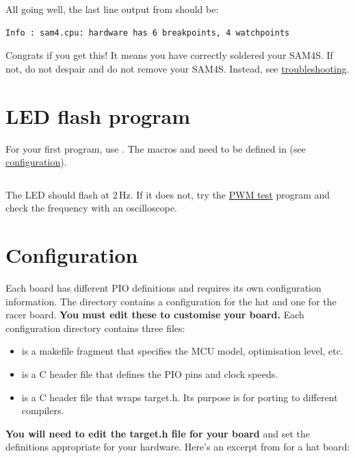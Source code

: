 All going well, the last line output from  should be:

\begin{verbatim}
Info : sam4.cpu: hardware has 6 breakpoints, 4 watchpoints
\end{verbatim}

Congrats if you get this! It means you have correctly soldered your
SAM4S. If not, do not despair and do not remove your SAM4S. Instead,
see \protect\hyperref[troubleshooting]{troubleshooting}.


\section{LED flash program}
\label{led-flash-program}

For your first program, use
. The macros 
and  need to be defined in  (see
\protect\hyperref[configuration]{configuration}).

\inputminted{C}{../../src/test-apps/ledflash1/ledflash1.c}

The LED should flash at 2\,Hz.  If it does not, try the
\hyperref[pwm-test]{PWM test} program and check the frequency with an
oscilloscope.


\section{Configuration}
\label{configuration}

Each board has different PIO definitions and requires its own
configuration information. The  directory contains a
configuration for the hat and one for the racer board.  \textbf{You
must edit these to customise your board.}  Each configuration
directory contains three files:

\begin{itemize}
\item
   is a makefile fragment that specifies the MCU model,
  optimisation level, etc.
\item
   is a C header file that defines the PIO pins and
  clock speeds.
\item
   is a C header file that wraps target.h. Its purpose
  is for porting to different compilers.
\end{itemize}

\textbf{You will need to edit the target.h file for your board} and set
the definitions appropriate for your hardware. Here's an excerpt from
 for a hat board:

